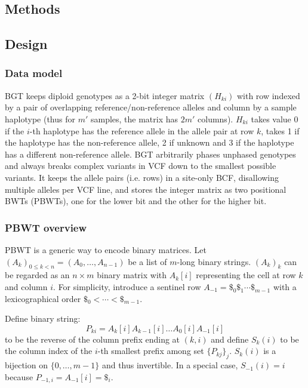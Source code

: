 \documentclass{bioinfo}
\begin{document}
\begin{methods}
\section{Methods}

\subsection{Design}

\subsubsection{Data model}

BGT keeps diploid genotypes as a 2-bit integer matrix $(H_{ki})$ with row
indexed by a pair of overlapping reference/non-reference alleles and column by
a sample haplotype (thus for $m'$ samples, the matrix has $2m'$ columns).
$H_{ki}$ takes value 0 if the $i$-th haplotype has the reference allele in the
allele pair at row $k$, takes 1 if the haplotype has the non-reference allele,
2 if unknown and 3 if the haplotype has a different non-reference allele. BGT
arbitrarily phases unphased genotypes and always breaks complex variants in VCF
down to the smallest possible variants. It keeps the allele pairs (i.e. rows)
in a site-only BCF, disallowing multiple alleles per VCF line, and stores the
integer matrix as two positional BWTs (PBWTs), one for the lower bit and the
other for the higher bit.

\subsubsection{PBWT overview}

PBWT is a generic way to encode binary matrices.  Let $(A_k)_{0\le
k<n}=(A_0,\ldots,A_{n-1})$ be a list of $m$-long binary strings. $(A_k)_k$ can
be regarded as an $n\times m$ binary matrix with $A_k[i]$ representing the
cell at row $k$ and column $i$.  For simplicity, introduce a sentinel row
$A_{-1}=\$_0\$_1\cdots\$_{m-1}$ with a lexicographical order
$\$_0<\cdots<\$_{m-1}$.

Define binary string:
\[
P_{ki}=A_k[i]A_{k-1}[i]\ldots A_0[i]A_{-1}[i]
\]
to be the reverse of the column prefix ending at $(k,i)$ and define $S_k(i)$ to
be the column index of the $i$-th smallest prefix among set $\{P_{kj}\}_j$.
$S_k(i)$ is a bijection on $\{0,\ldots,m-1\}$ and thus invertible. In a
special case, $S_{-1}(i)=i$ because $P_{-1,i}=A_{-1}[i]=\$_i$.


\end{methods}
\end{document}
